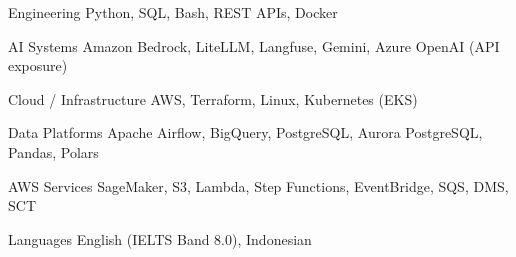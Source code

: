 

\begin{cvskills}

  \cvskill
    {Engineering}
    {Python, SQL, Bash, REST APIs, Docker}

  \cvskill
    {AI Systems}
    {Amazon Bedrock, LiteLLM, Langfuse, Gemini, Azure OpenAI (API exposure)}

  \cvskill
    {Cloud / Infrastructure}
    {AWS, Terraform, Linux, Kubernetes (EKS)}

  \cvskill
    {Data Platforms}
    {Apache Airflow, BigQuery, PostgreSQL, Aurora PostgreSQL, Pandas, Polars}

  \cvskill
    {AWS Services}
    {SageMaker, S3, Lambda, Step Functions, EventBridge, SQS, DMS, SCT}

  \cvskill
    {Languages}
    {English (IELTS Band 8.0), Indonesian}

\end{cvskills}

